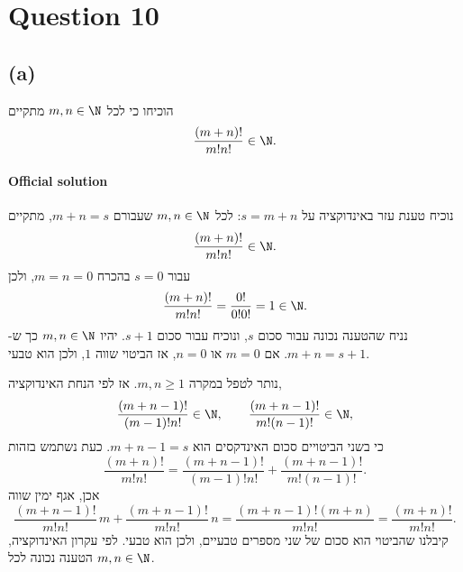 \documentclass[12pt]{article}
\begin{document}
\section*{Question 10}

\subsection*{(a)}
הוכיחו כי לכל \(m,n\in\N\) מתקיים
\[
\frac{(m+n)!}{m!n!}\in\N.
\]

\paragraph{Official solution}
נוכיח טענת עזר באינדוקציה על \(s=m+n\): לכל \(m,n\in\N\) שעבורם \(m+n=s\), מתקיים
\[
\frac{(m+n)!}{m!n!}\in\N.
\]
עבור \(s=0\) בהכרח \(m=n=0\), ולכן
\[
\frac{(m+n)!}{m!n!}=\frac{0!}{0!0!}=1\in\N.
\]
נניח שהטענה נכונה עבור סכום \(s\), ונוכיח עבור סכום \(s+1\). יהיו \(m,n\in\N\) כך ש-\(m+n=s+1\).
אם \(m=0\) או \(n=0\), אז הביטוי שווה \(1\), ולכן הוא טבעי.

נותר לטפל במקרה \(m,n\ge1\). אז לפי הנחת האינדוקציה,
\[
\frac{(m+n-1)!}{(m-1)!n!}\in\N,
\qquad
\frac{(m+n-1)!}{m!(n-1)!}\in\N,
\]
כי בשני הביטויים סכום האינדקסים הוא \(m+n-1=s\). כעת נשתמש בזהות
\[
\frac{(m+n)!}{m!n!}
=\frac{(m+n-1)!}{(m-1)!n!}
+\frac{(m+n-1)!}{m!(n-1)!}.
\]
אכן, אגף ימין שווה
\[
\frac{(m+n-1)!}{m!n!}\,m+\frac{(m+n-1)!}{m!n!}\,n
=\frac{(m+n-1)!(m+n)}{m!n!}
=\frac{(m+n)!}{m!n!}.
\]
קיבלנו שהביטוי הוא סכום של שני מספרים טבעיים, ולכן הוא טבעי. לפי עקרון האינדוקציה, הטענה נכונה לכל \(m,n\in\N\).
\end{document}
